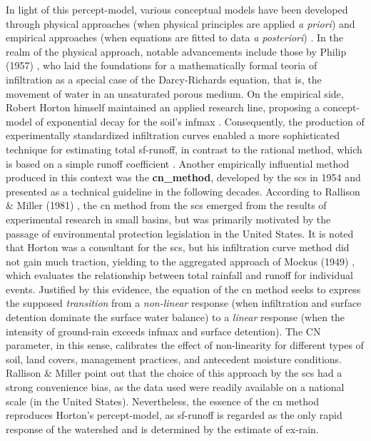 \documentclass[./main_en.tex]{subfiles}
\begin{document}
\par In light of this \gls{percept-model}, various conceptual models have been developed through physical approaches (when physical principles are applied \textit{a priori}) and empirical approaches (when equations are fitted to data \textit{a posteriori}) \cite{mishra2003}. In the realm of the physical approach, notable advancements include those by Philip (1957) \cite{philip1957}, who laid the foundations for a mathematically formal \gls{teoria} of infiltration as a special case of the Darcy-Richards equation, that is, the movement of water in an unsaturated porous medium. On the empirical side, Robert Horton himself maintained an applied research line, proposing a \gls{concept-model} of exponential decay for the soil’s \gls{infmax} \cite{Horton1939}. Consequently, the production of experimentally standardized infiltration curves enabled a more sophisticated technique for estimating total \gls{sf-runoff}, in contrast to the rational method, which is based on a simple runoff coefficient \cite{Cook1946}. Another empirically influential method produced in this context was the \textbf{\gls{cn_method}}, developed by the \acrfull{scs} in 1954 and presented as a technical guideline in the following decades. According to Rallison \& Miller (1981) \cite{Rallison1981}, the \acrshort{cn} method from the \acrshort{scs} emerged from the results of experimental research in small basins, but was primarily motivated by the passage of environmental protection legislation in the United States. It is noted that Horton was a consultant for the \acrshort{scs}, but his infiltration curve method did not gain much traction, yielding to the aggregated approach of Mockus (1949) \cite{mockus1949}, which evaluates the relationship between total rainfall and runoff for individual events. Justified by this evidence, the equation of the \acrshort{cn} method seeks to express the supposed \textit{transition} from a \textit{non-linear} response (when infiltration and surface detention dominate the surface water balance) to a \textit{linear} response (when the intensity of \gls{ground-rain} exceeds \gls{infmax} and surface detention). The CN parameter, in this sense, calibrates the effect of non-linearity for different types of soil, land covers, management practices, and antecedent moisture conditions. Rallison \& Miller point out that the choice of this approach by the \acrshort{scs} had a strong convenience bias, as the data used were readily available on a national scale (in the United States). Nevertheless, the essence of the \acrshort{cn} method reproduces Horton’s \gls{percept-model}, as \gls{sf-runoff} is regarded as the only rapid response of the watershed and is determined by the estimate of \gls{ex-rain}.
\end{document}
